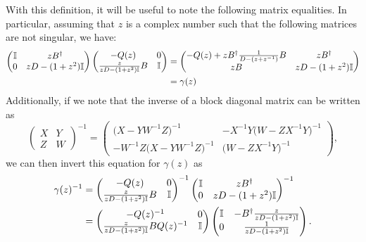 \documentclass[../thesis-main/thesis-main]{subfiles}
\begin{document}
With this definition, it will be useful to note the following matrix equalities.  In particular, assuming that $z$ is a complex number such that the following matrices are not singular, we have:
\begin{align}
  \begin{pmatrix} \mathbb{I} & zB^\dag\\
    0 & z D - (1+ z^2) \mathbb{I} \end{pmatrix}
    \begin{pmatrix} - Q(z) & 0\\
      \frac{z}{zD - (1+ z^2)\mathbb{I}}B & \mathbb{I}\end{pmatrix} 
      &= \begin{pmatrix} -Q(z) + z B^\dag \frac{1}{D - (z + z^{-1})} B & z B^\dag\\
        zB & zD - (1+z^2)\mathbb{I}\end{pmatrix} \\
        &= \gamma(z)
\end{align}
Additionally, if we note that the inverse of a block diagonal matrix can be written as
\begin{equation}
  \begin{pmatrix} X & Y \\
  Z & W\end{pmatrix}^{-1} = \begin{pmatrix} \big(X - Y W^{-1} Z\big)^{-1} & - X^{-1} Y \big(W - Z X^{-1} Y\big)^{-1}\\
    - W^{-1} Z \big(X - Y W^{-1} Z\big)^{-1} & \big(W - Z X^{-1} Y\big)^{-1}\end{pmatrix},
\end{equation}
we can then invert this equation for $\gamma(z)$ as 
\begin{align}\gamma(z)^{-1} &= \begin{pmatrix} - Q(z) & 0\\
      \frac{z}{zD - (1+ z^2)\mathbb{I}}B & \mathbb{I}\end{pmatrix}^{-1} \begin{pmatrix} \mathbb{I} & zB^\dag\\
    0 & z D - (1+ z^2) \mathbb{I} \end{pmatrix}^{-1}\\
    &= \begin{pmatrix}
      - Q(z)^{-1} & 0\\
      \frac{z}{z D - (1+z^2)\mathbb{I}} B Q(z)^{-1} & \mathbb{I}
    \end{pmatrix}
    \begin{pmatrix}
      \mathbb{I} & - B^{\dag} \frac{z}{zD - (1+z^2)\mathbb{I}}\\
      0 & \frac{1}{zD - (1+z^2)\mathbb{I}}
    \end{pmatrix}.
\end{align}
\end{document}
